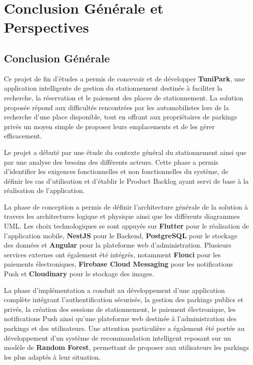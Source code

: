 \chapter*{Conclusion Générale et Perspectives}

\section*{Conclusion Générale}

\par Ce projet de fin d'études a permis de concevoir et de développer \textbf{TuniPark}, une application intelligente de gestion du stationnement destinée à faciliter la recherche, la réservation et le paiement des places de stationnement. La solution proposée répond aux difficultés rencontrées par les automobilistes lors de la recherche d'une place disponible, tout en offrant aux propriétaires de parkings privés un moyen simple de proposer leurs emplacements et de les gérer efficacement.

\par Le projet a débuté par une étude du contexte général du stationnement ainsi que par une analyse des besoins des différents acteurs. Cette phase a permis d'identifier les exigences fonctionnelles et non fonctionnelles du système, de définir les cas d'utilisation et d'établir le Product Backlog ayant servi de base à la réalisation de l'application.

\par La phase de conception a permis de définir l'architecture générale de la solution à travers les architectures logique et physique ainsi que les différents diagrammes UML. Les choix technologiques se sont appuyés sur \textbf{Flutter} pour le réalisation  de l'application mobile, \textbf{NestJS} pour le Backend, \textbf{PostgreSQL} pour le stockage des données et \textbf{Angular} pour la plateforme web d'administration. Plusieurs services externes ont également été intégrés, notamment \textbf{Flouci} pour les paiements électroniques, \textbf{Firebase Cloud Messaging} pour les notifications Push et \textbf{Cloudinary} pour le stockage des images.

\par La phase d'implémentation a conduit au développement d'une application complète intégrant l'authentification sécurisée, la gestion des parkings publics et privés, la création des sessions de stationnement, le paiement électronique, les notifications Push ainsi qu'une plateforme web destinée à l'administration des parkings et des utilisateurs. Une attention particulière a également été portée au développement d'un système de recommandation intelligent reposant sur un modèle de \textbf{Random Forest}, permettant de proposer aux utilisateurs les parkings les plus adaptés à leur situation.

